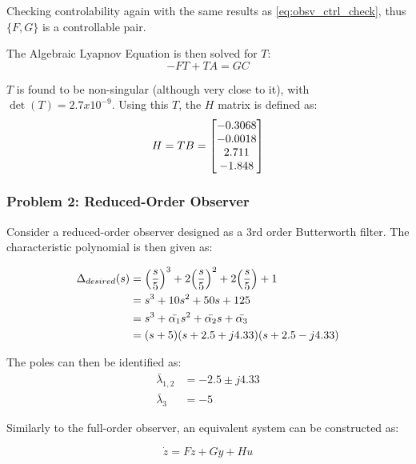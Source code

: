 \documentclass[]{article}
\begin{document}
 			Checking controlability again with the same results as \eqref{eq:obsv_ctrl_check}, thus $\{F,G\}$ is a controllable pair.
 			
 			The Algebraic Lyapnov Equation is then solved for $T$:
 			\begin{equation}
 				-F T + T A = G C
 			\end{equation}
 			
 			$T$ is found to be non-singular (although very close to it), with $\det(T) = 2.7 x 10^{-9}$. Using this $T$, the $H$ matrix is defined as:
 			\begin{equation}
 				H = T B = \mqty[-0.3068\\ -0.0018\\ 2.711\\ -1.848]
 			\end{equation}
 			
		\newpage
		\subsubsection{Problem 2: Reduced-Order Observer}
			Consider a reduced-order observer designed as a 3rd order Butterworth filter. The characteristic polynomial is then given as:
			
			\begin{equation}
				\begin{aligned}
					\Delta_{desired} (s) 	&= \qty(\frac{s}{5})^3 + 2 			\qty(\frac{s}{5})^2 + 2 \qty(\frac{s}{5}) + 1\\
					&= s^3 + 10 s^2 + 50 s + 125\\
					&= s^3 + \bar{\alpha_1} s^2 + \bar{\alpha_2} s + \bar{\alpha_3}\\
					&= (s + 5)(s+2.5 + j 4.33)(s+2.5 - j 4.33)
				\end{aligned}\label{eq:reduced_obsv_char_poly}
			\end{equation}
			
			The poles can then be identified as:
			\begin{equation}
				\begin{aligned}
					\bar{\lambda}_{1,2} &= -2.5 \pm j 4.33\\
					\bar{\lambda}_{3} &= -5
				\end{aligned}
				\label{eq:reduced_obsv_poles}
			\end{equation}
			
			Similarly to the full-order observer, an equivalent system can be constructed as:
			
			\begin{equation}
				\dot{z} = F z + G y + H u
			\end{equation}
			
\end{document}
